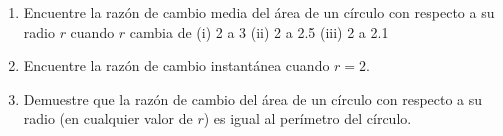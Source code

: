 \item 
\begin{enumerate}
    \item[(a)] Encuentre la razón de cambio media del área de un círculo con respecto a su radio $r$ cuando $r$ cambia de
    (i) 2 a 3 \quad (ii) 2 a 2.5 \quad (iii) 2 a 2.1
    \item[(b)] Encuentre la razón de cambio instantánea cuando $r = 2$.
    \item[(c)] Demuestre que la razón de cambio del área de un círculo con respecto a su radio (en cualquier valor de $r$) es igual al perímetro del círculo.
\end{enumerate}
